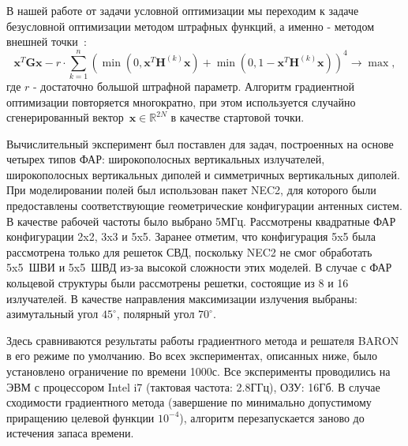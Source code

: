 В нашей работе от задачи условной оптимизации мы переходим к задаче безусловной оптимизации методом штрафных функций, а именно -
методом внешней точки~\autocite{eremin:convex,aoki:mo}:
\begin{equation}
       \textbf{x}^{T}\textbf{Gx} - r\cdot \sum_{k=1}^n
       \left( \min\left(0,\textbf{x}^{T}\textbf{H}^{(k)}\textbf{x}\right) +
       \min\left(0,1-\textbf{x}^{T}\textbf{H}^{(k)}\textbf{x}\right)\right)^4 \rightarrow
       \max,
     \label{eq:task4}
\end{equation}
где $r$ - достаточно большой штрафной параметр. Алгоритм градиентной оптимизации повторяется многократно, при этом используется случайно сгенерированный вектор~$\textbf{x}\in \mathbb{R}^{2N}$ в качестве стартовой точки.

Вычислительный эксперимент был поставлен для задач, построенных на основе четырех типов ФАР: широкополосных вертикальных излучателей, широкополосных вертикальных диполей и симметричных вертикальных диполей. При моделировании полей был использован пакет NEC2, для которого были предоставлены соответствующие геометрические конфигурации антенных систем. В качестве рабочей частоты было выбрано 5МГц. Рассмотрены квадратные ФАР конфигурации 2x2, 3x3 и 5x5. Заранее отметим, что конфигурация 5x5 была рассмотрена только для решеток СВД, поскольку NEC2 не смог обработать 5x5~ШВИ и 5x5~ШВД из-за высокой сложности этих моделей. В случае с ФАР кольцевой структуры были рассмотрены решетки, состоящие из 8 и 16 излучателей. В качестве направления максимизации излучения выбраны: азимутальный угол $45^{\circ}$, полярный угол $70^{\circ}$.

Здесь сравниваются результаты работы градиентного метода и решателя BARON в его режиме по умолчанию. Во всех экспериментах, описанных ниже, было установлено ограничение по времени 1000с. Все эксперименты проводились на ЭВМ с процессором Intel i7 (тактовая частота: 2.8ГГц), ОЗУ: 16Гб. В случае сходимости градиентного метода (завершение по минимально допустимому приращению целевой функции $10^{-4}$), алгоритм перезапускается заново до истечения запаса времени.

